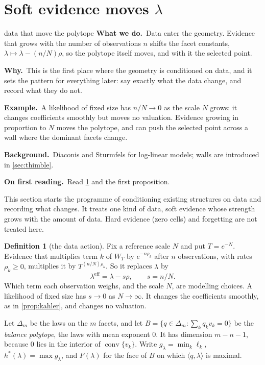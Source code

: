 \documentclass[11pt]{article}
\theoremstyle{definition}\newtheorem{definition}[theorem]{Definition}\newtheorem{remark}[theorem]{Remark}\newtheorem{example}[theorem]{Example}\newtheorem{problem}[theorem]{Open problem}\crefname{problem}{Problem}{Problems}
\newcommand{\rbwhat}{\textcolor{rbWhat}{\textbf{What we do.}}~}\newcommand{\rbwhy}{\par\smallskip\textcolor{rbWhy}{\textbf{Why.}}~}
\newcommand{\rbex}{\par\smallskip\textcolor{rbEx}{\textbf{Example.}}~}\newcommand{\rbbg}{\par\smallskip\textcolor{rbBg}{\textbf{Background.}}~}
\newcommand{\rbfirst}{\par\smallskip\textcolor{rbFirst}{\textbf{On first reading.}}~}
\begin{document}
\section{Soft evidence moves \texorpdfstring{$\lambda$}{lambda}}\label{sec:data}
\begin{readerbox}{data that move the polytope}
\rbwhat Data enter the geometry. Evidence that grows with the number of observations $n$ shifts the facet constants, $\lambda\mapsto\lambda-(n/N)\rho$, so the polytope itself moves, and with it the selected point.
\rbwhy This is the first place where the geometry is conditioned on data, and it sets the pattern for everything later: say exactly what the data change, and record what they do not.
\rbex A likelihood of fixed size has $n/N\to0$ as the scale $N$ grows: it changes coefficients smoothly but moves no valuation. Evidence growing in proportion to $N$ moves the polytope, and can push the selected point across a wall where the dominant facets change.
\rbbg Diaconis and Sturmfels \cite{DiaconisSturmfels1998} for log-linear models; walls are introduced in \cref{sec:thimble}.
\rbfirst Read \cref{conv:data} and the first proposition.
\end{readerbox}
This section starts the programme of conditioning existing structures on data and recording what changes. It treats one kind of data,
soft evidence whose strength grows with the amount of data. Hard evidence (zero cells) and forgetting are not treated here.

\begin{definition}[the data action]\label{conv:data}
Fix a reference scale $N$ and put $T=e^{-N}$. Evidence that multiplies term $k$ of $W_T$ by $e^{-n\rho_k}$ after $n$ observations, with rates $\rho_k\ge0$, multiplies it by
$T^{(n/N)\rho_k}$. So it replaces $\lambda$ by
\[
\lambda^{\mathrm{eff}}=\lambda-s\rho,\qquad s=n/N .
\]
Which term each observation weighs, and the scale $N$, are modelling choices. A likelihood of fixed size has $s\to0$ as $N\to\infty$. It changes the
coefficients smoothly, as in \cref{prop:kahler}, and changes no valuation.
\end{definition}

Let $\Delta_m$ be the laws on the $m$ facets, and let $B=\{q\in\Delta_m:\sum_kq_kv_k=0\}$ be the \emph{balance polytope}, the laws with mean exponent $0$. It has dimension $m-n-1$,
because $0$ lies in the interior of $\operatorname{conv}\{v_k\}$. Write $g_\lambda=\min_k\ell_k$, $h^*(\lambda)=\max g_\lambda$, and $F(\lambda)$ for the face of $B$ on which $\langle q,\lambda\rangle$ is maximal.
\end{document}
